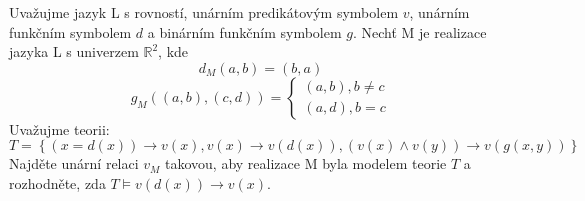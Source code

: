 Uvažujme jazyk L s rovností, unárním predikátovým symbolem $v$, unárním funkčním
symbolem $d$ a binárním funkčním symbolem $g$. Nechť M je realizace jazyka L s
univerzem $\mathbb{R}^{2}$, kde
$$d_{M}(a,b)=(b,a)$$
$$g_{M}((a,b),(c,d))=\left\{\begin{matrix}
(a,b),b \neq c\\(a,d), b=c
\end{matrix}\right.$$
Uvažujme teorii: $T=\left \{ \left ( x=d(x) \right )\rightarrow
v(x),v(x)\rightarrow v(d(x)), (v(x)\wedge v(y))\rightarrow v(g(x,y))\right \}$
Najděte unární relaci $v_{M}$ takovou, aby realizace M byla modelem teorie $T$ a
rozhodněte, zda $T\models v(d(x)) \rightarrow v(x)$.
